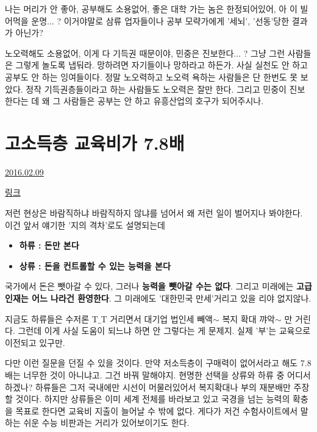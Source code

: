 나는 머리가 안 좋아, 공부해도 소용없어, 좋은 대학 가는 놈은 한정되어있어, 아 이 빌어먹을 운명... ?
이거야말로 삼류 업자들이나 공부 모략가에게 '세뇌', '선동'당한 결과가 아닌가?
\vspace{5mm}

노오력해도 소용없어, 이게 다 기득권 때문이야, 민중은 진보한다... ?
그냥 그런 사람들은 그렇게 놀도록 냅둬라. 망하려면 자기들이나 망하라고 하든가. 사실 실천도 안 하고 공부도 안 하는 잉여들이다.
정말 노오력하고 노오력 욕하는 사람들은 단 한번도 못 보았다. 정작 기득권층들이라고 하는 사람들도 노오력은 잘만 한다.
그리고 민중이 진보한다는 데 왜 그 사람들은 공부는 안 하고 유흥산업의 호구가 되어주시나.
\vspace{5mm}






\section{고소득층 교육비가 7.8배}
\href{https://www.kockoc.com/Apoc/629310}{2016.02.09}

\vspace{5mm}

\href{http://news.nate.com/view/20160209n04928?modit=1454984815}{링크}
\vspace{5mm}

저런 현상은 바람직하냐 바람직하지 않냐를 넘어서 왜 저런 일이 벌어지나 봐야한다.
이건 앞서 얘기한 '지의 격차'로도 설명되는데
\vspace{5mm}
\begin{itemize}
    \item \textbf{하류 : 돈만 본다}
    \item \textbf{상류 : 돈을 컨트롤할 수 있는 능력을 본다}
\end{itemize}
\vspace{5mm}

국가에서 돈은 뺏아갈 수 있다, 그러나 \textbf{능력을 뺏아갈 수는 없다}.
그리고 미래에는 \textbf{고급인재는 어느 나라건 환영한다}.
그 미래에도 '대한민국 만세'거리고 있을 리야 없지않나.
\vspace{5mm}

지금도 하류들은 수저론 T$\_$T 거리면서 대기업 법인세 빼액$\sim$ 복지 확대 꺄악$\sim$ 만 거린다.
그런데 이게 사실 도움이 되느냐 하면 안 그렇다는 게 문제지. 실제 '부'는 교육으로 이전되고 있구만.
\vspace{5mm}

다만 이런 질문을 던질 수 있을 것이다. 만약 저소득층이 구매력이 없어서라고 해도 7.8배는 너무한 것이 아니냐고.
그건 바꿔 말해야지. 현명한 선택을 상류와 하류 중 어디서 하겠나?
하류들은 그저 국내에만 시선이 머물러있어서 복지확대나 부의 재분배만 주장할 것이다.
하지만 상류들은 이미 세계 전체를 바라보고 있고 국경을 넘는 능력의 확충을 목표로 한다면 교육비 지출이 늘어날 수 밖에 없다.
게다가 저건 수험사이트에서 말하는 쉬운 수능 비판과는 거리가 있어보이기도 한다.
\vspace{5mm}

